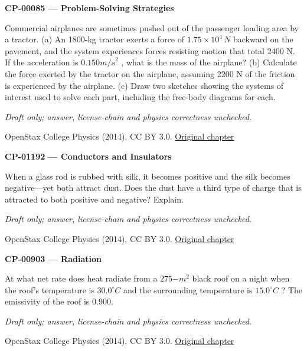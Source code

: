 \par\medskip
\noindent\textbf{CP-00085 — Problem-Solving Strategies}
\par Commercial airplanes are sometimes pushed out of the passenger loading area by a tractor. (a) An 1800-kg tractor exerts a force of $1.75\times{}{10}^{4}\,N$ backward on the pavement, and the system experiences forces resisting motion that total 2400 N. If the acceleration is $0.{150 m/s}^{2}$ , what is the mass of the airplane? (b) Calculate the force exerted by the tractor on the airplane, assuming 2200 N of the friction is experienced by the airplane. (c) Draw two sketches showing the systems of interest used to solve each part, including the free-body diagrams for each.
\par\smallskip
\textit{Draft only; answer, license-chain and physics correctness unchecked.}
\par{\footnotesize OpenStax College Physics (2014), CC BY 3.0. \href{https://github.com/philschatz/physics-book/blob/a7efaa7e221fab1694022d8bb98b83a73ee31d3d/contents/m42076.md}{Original chapter}}\par\normalsize

\par\medskip
\noindent\textbf{CP-01192 — Conductors and Insulators}
\par When a glass rod is rubbed with silk, it becomes positive and the silk becomes negative—yet both attract dust. Does the dust have a third type of charge that is attracted to both positive and negative? Explain.
\par\smallskip
\textit{Draft only; answer, license-chain and physics correctness unchecked.}
\par{\footnotesize OpenStax College Physics (2014), CC BY 3.0. \href{https://github.com/philschatz/physics-book/blob/a7efaa7e221fab1694022d8bb98b83a73ee31d3d/contents/m42306.md}{Original chapter}}\par\normalsize

\par\medskip
\noindent\textbf{CP-00903 — Radiation}
\par At what net rate does heat radiate from a $275{-m}^{2}$ black roof on a night when the roof’s temperature is $30.0^{\circ}C$ and the surrounding temperature is $15.0^{\circ}C$ ? The emissivity of the roof is 0.900.
\par\smallskip
\textit{Draft only; answer, license-chain and physics correctness unchecked.}
\par{\footnotesize OpenStax College Physics (2014), CC BY 3.0. \href{https://github.com/philschatz/physics-book/blob/a7efaa7e221fab1694022d8bb98b83a73ee31d3d/contents/m42230.md}{Original chapter}}\par\normalsize


